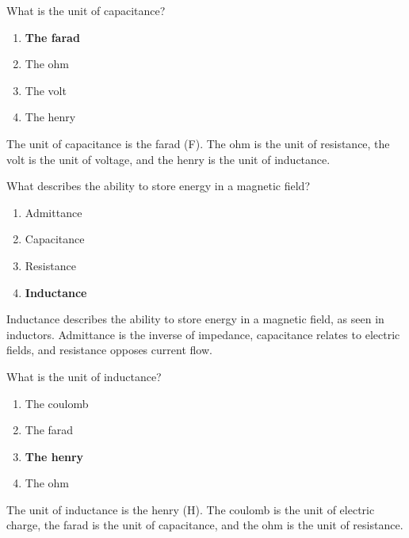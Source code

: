 
\begin{tcolorbox}[colback=gray!10!white,colframe=black!75!black,title={T5C02}]
    What is the unit of capacitance?
    \begin{enumerate}[label=\Alph*),noitemsep]
        \item \textbf{The farad}
        \item The ohm
        \item The volt
        \item The henry
    \end{enumerate}
\end{tcolorbox}
The unit of capacitance is the farad (F). The ohm is the unit of resistance, the volt is the unit of voltage, and the henry is the unit of inductance.


\begin{tcolorbox}[colback=gray!10!white,colframe=black!75!black,title={T5C03}]
    What describes the ability to store energy in a magnetic field?
    \begin{enumerate}[label=\Alph*),noitemsep]
        \item Admittance
        \item Capacitance
        \item Resistance
        \item \textbf{Inductance}
    \end{enumerate}
\end{tcolorbox}
Inductance describes the ability to store energy in a magnetic field, as seen in inductors. Admittance is the inverse of impedance, capacitance relates to electric fields, and resistance opposes current flow.


\begin{tcolorbox}[colback=gray!10!white,colframe=black!75!black,title={T5C04}]
    What is the unit of inductance?
    \begin{enumerate}[label=\Alph*),noitemsep]
        \item The coulomb
        \item The farad
        \item \textbf{The henry}
        \item The ohm
    \end{enumerate}
\end{tcolorbox}
The unit of inductance is the henry (H). The coulomb is the unit of electric charge, the farad is the unit of capacitance, and the ohm is the unit of resistance.

